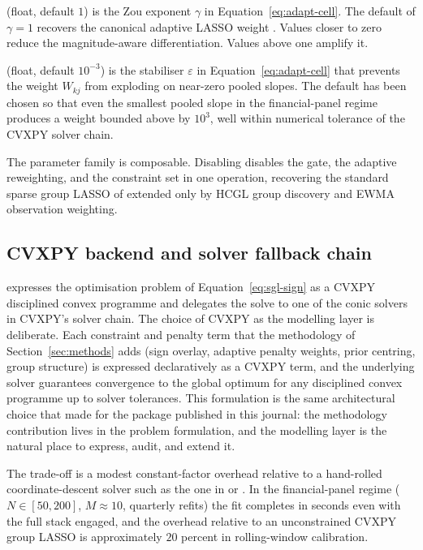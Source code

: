 \documentclass[article]{jss}
\begin{document}
 (float, default $1$) is the Zou
exponent $\gamma$ in Equation~\ref{eq:adapt-cell}. The default of
$\gamma = 1$ recovers the canonical adaptive LASSO weight
\citep{Zou:2006}. Values closer to zero reduce the magnitude-aware
differentiation. Values above one amplify it.

 (float, default $10^{-3}$) is the
stabiliser $\varepsilon$ in Equation~\ref{eq:adapt-cell} that
prevents the weight $W_{kj}$ from exploding on near-zero pooled
slopes. The default has been chosen so that even the smallest
pooled slope in the financial-panel regime produces a weight bounded
above by $10^{3}$, well within numerical tolerance of the CVXPY
solver chain.

The parameter family is composable. Disabling
 disables the gate, the adaptive
reweighting, and the constraint set in one operation, recovering the
standard sparse group LASSO of \cite{Simon+Friedman+Hastie+Tibshirani:2013}
extended only by HCGL group discovery and EWMA observation weighting.


\subsection[CVXPY backend and solver fallback chain]{CVXPY backend and solver fallback chain} \label{sec:cvxpy-backend}

 expresses the optimisation problem of
Equation~\ref{eq:sgl-sign} as a CVXPY \citep{Diamond+Boyd:2016}
disciplined convex programme and delegates the solve to one of the
conic solvers in CVXPY's solver chain. The choice of CVXPY as the
modelling layer is deliberate. Each constraint and penalty term that
the methodology of Section~\ref{sec:methods} adds (sign overlay,
adaptive penalty weights, prior centring, group structure) is
expressed declaratively as a CVXPY term, and the underlying solver
guarantees convergence to the global optimum for any disciplined
convex programme \citep{Grant+Boyd+Ye:2006} up to
solver tolerances. This formulation is the same
architectural choice that \cite{Fu+Narasimhan+Boyd:2020} made for the
 package published in this journal: the methodology
contribution lives in the problem formulation, and the modelling
layer is the natural place to express, audit, and extend it.

The trade-off is a modest constant-factor overhead relative to a
hand-rolled coordinate-descent solver such as the one in
 \citep{Liang+Cohen+SolonHeinsfeld+Pestilli+McDonald:2024} or
 \citep{Yang+Hastie:2024}. In the financial-panel regime
($N \in [50, 200]$, $M \approx 10$, quarterly refits) the
 fit completes in seconds even with the full
 stack engaged, and the overhead relative to an
unconstrained CVXPY group LASSO is approximately $20$ percent in
rolling-window calibration.
\end{document}
